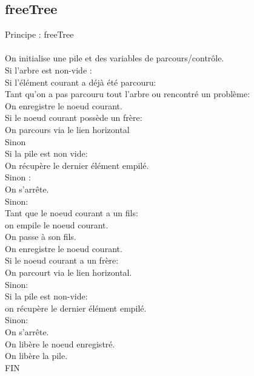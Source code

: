 \documentclass[a4paper]{article}
\newcommand\tab[1][1cm]{\hspace*{#1}}
\begin{document}
\subsection{freeTree}
\begin{algorithm}
Principe : freeTree
\\
\\
\tab On initialise une pile et des variables de parcours/contrôle.
\\
\tab Si l'arbre est non-vide :
\\
\tab \tab Si l'élément courant a déjà été parcouru:
\\
\tab \tab \tab Tant qu'on a pas parcouru tout l'arbre ou rencontré un problème:
\\
\tab \tab \tab \tab On enregistre le noeud courant.
\\
\tab \tab \tab \tab Si le noeud courant possède un frère:
\\
\tab \tab \tab \tab \tab On parcours via le lien horizontal
\\
\tab \tab \tab \tab Sinon
\\
\tab \tab \tab \tab \tab Si la pile est non vide:
\\
\tab \tab \tab \tab \tab \tab On récupère le dernier élément empilé.
\\
\tab \tab \tab \tab \tab Sinon :
\\
\tab \tab \tab \tab \tab \tab On s'arrête.
\\
\tab \tab Sinon:
\\
\tab \tab \tab Tant que le noeud courant a un fils:
\\
\tab \tab \tab \tab on empile le noeud courant.
\\
\tab \tab \tab \tab On passe à son fils.
\\
\tab \tab \tab On enregistre le noeud courant.
\\
\tab \tab \tab Si le noeud courant a un frère:
\\
\tab \tab \tab \tab On parcourt via le lien horizontal.
\\
\tab \tab \tab Sinon:
\\
\tab \tab \tab \tab Si la pile est non-vide:
\\
\tab \tab \tab \tab \tab on récupère le dernier élément empilé.
\\
\tab \tab \tab \tab Sinon:
\\
\tab \tab \tab \tab \tab On s'arrête.
\\
\tab \tab \tab On libère le noeud enregistré.
\\
\tab On libère la pile.
\\
FIN
\end{algorithm}
\end{document}
